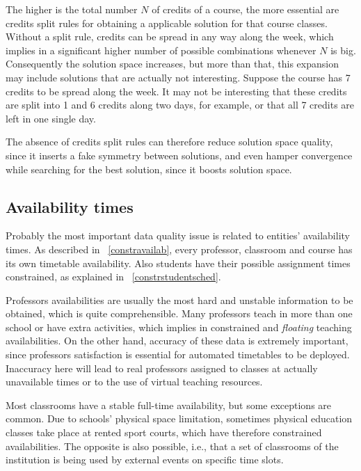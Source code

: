 The higher is the total number $N$ of credits of a course, the more essential are credits split rules for obtaining a applicable solution for that course classes. Without a split rule, credits can be spread in any way along the week, which implies in a significant higher number of possible combinations whenever $N$ is big. Consequently the solution space increases, but more than that, this expansion may include solutions that are actually not interesting. Suppose the course  has 7 credits to be spread along the week. It may not be interesting that these credits are split into 1 and 6 credits along two days, for example, or that all 7 credits are left in one single day.

The absence of credits split rules can therefore reduce solution space quality, since it inserts a fake symmetry between solutions, and even hamper convergence while searching for the best solution, since it boosts  solution space.


\subsection{Availability times}

Probably the most important data quality issue is related to entities' availability times. As described in ~\ref{constravailab}, every professor, classroom and course has its own timetable availability. Also students have their possible assignment times constrained, as explained in ~\ref{constrstudentsched}.

Professors availabilities are usually the most hard and unstable information to be obtained, which is quite comprehensible. Many professors teach in more than one school or have extra activities, which implies in constrained and \textit{floating} teaching availabilities. On the other hand, accuracy of these data is extremely important, since professors satisfaction is essential for automated timetables to be deployed. Inaccuracy here will lead to real professors assigned to classes at actually unavailable times or to the use of virtual teaching resources.

Most classrooms have a stable full-time availability, but some exceptions are common. Due to schools' physical space limitation, sometimes  physical education classes take place at rented sport courts, which have therefore constrained availabilities. The opposite is also possible, i.e., that a set of classrooms of the institution is being used by external events on specific time slots.

